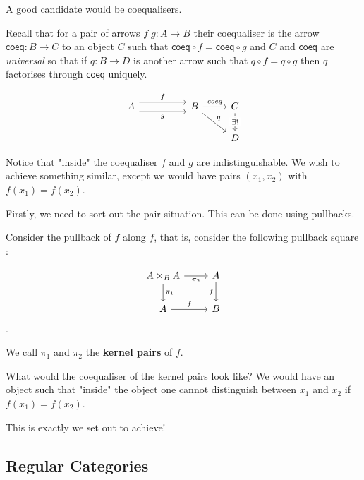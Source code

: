 \documentclass{article}
\newcommand{\id}[1]{\mathsf{#1}}
\theoremstyle{plain}
\theoremstyle{remark}
\begin{document}
A good candidate would be coequalisers. 

Recall that for a pair of arrows $f \; g : A \to B$ their coequaliser is the arrow $\id{coeq} : B \to C$ to an object $C$ such that $\id{coeq} \circ f = \id{coeq} \circ g$ and $C$ and $\id{coeq}$ are \emph{universal} so that if $q : B \to D$ is another arrow such that $q \circ f = q \circ g$ then $q$ factorises through $\id{coeq}$ uniquely. 


\[\begin{tikzcd}
	A && B & C \\
	&&& D
	\arrow["f", shift left=2, from=1-1, to=1-3]
	\arrow["g"', shift right=2, from=1-1, to=1-3]
	\arrow["coeq", from=1-3, to=1-4]
	\arrow["q", from=1-3, to=2-4]
	\arrow["{\exists!}"{description}, dashed, from=1-4, to=2-4]
\end{tikzcd}\]

Notice that "inside" the coequaliser $f$ and $g$ are indistinguishable. We wish to achieve something similar, except we would have pairs $(x_1,x_2)$ with $f(x_1) = f(x_2)$.

Firstly, we need to sort out the pair situation. This can be done using pullbacks. 

Consider the pullback of $f$ along $f$, that is, consider the following pullback square :

\[\begin{tikzcd}
	{A\times_BA} & A \\
	A & B
	\arrow["f", from=2-1, to=2-2]
	\arrow["f"', from=1-2, to=2-2]
	\arrow["{\pi_2}"', from=1-1, to=1-2]
	\arrow["{\pi_1}", from=1-1, to=2-1]
\end{tikzcd}\].

We call $\pi_1$ and $\pi_2$ the \textbf{kernel pairs} of $f$. 

What would the coequaliser of the kernel pairs look like? 
We would have an object such that "inside" the object one cannot distinguish between $x_1$ and $x_2$ if $f(x_1) = f(x_2)$. 

This is exactly we set out to achieve!

\subsection{Regular Categories}
\end{document}
